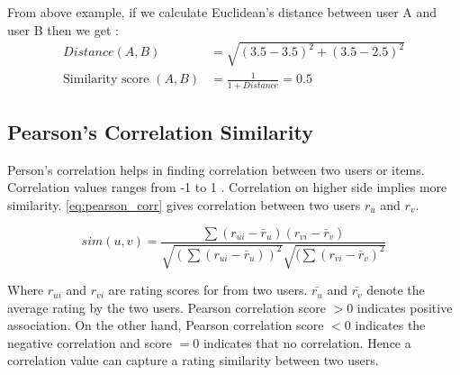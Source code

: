 \noindent From above example, if we calculate Euclidean's distance between user A and user B then we get :
\begin{align*}
Distance (A, B) &= \sqrt{(3.5 - 3.5)^{2} + (3.5 - 2.5)^{2}} \\
\textrm{Similarity score }(A,B) &= \frac{1}{1+ Distance} = 0.5
\end{align*}


\subsection{Pearson's Correlation Similarity}
\label{pearson_correlation}
Person's correlation helps in finding correlation between two users or items. Correlation values ranges from -1 to 1 \cite{20}. Correlation on higher side implies more similarity. \autoref{eq:pearson_corr} gives correlation between two users $r_{u}$ and $r_{v}$.

\begin{equation}
sim(u,v) = \frac{\sum (r_{ui} - \bar{r}_u) (r_{vi} - \bar{r}_v )}{\sqrt{(\sum (r_{ui} - \bar{r}_u))^2} \sqrt{(\sum (r_{vi} - \bar{r}_v )^2}}
\label{eq:pearson_corr}
\end{equation}

\noindent Where $r_{ui}$ and $r_{vi}$ are rating scores for from two users. $\bar{r_{u}}$ and $\bar{r_{v}}$ denote the average rating by the two users.
Pearson correlation score $> 0$ indicates positive association. On the other hand, Pearson correlation score $ < 0$ indicates the negative correlation and score $ = 0$ indicates that no correlation. Hence a correlation value can capture a rating similarity between two users.
